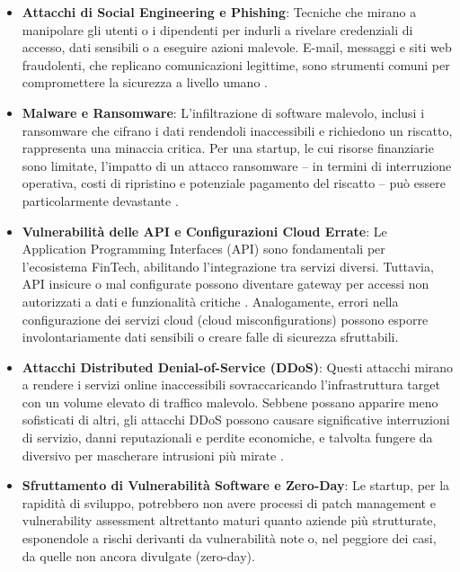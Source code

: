 \begin{itemize}
    \item \textbf{Attacchi di Social Engineering e Phishing}: Tecniche che mirano a manipolare gli utenti o i dipendenti per indurli a rivelare credenziali di accesso, dati sensibili o a eseguire azioni malevole. E-mail, messaggi e siti web fraudolenti, che replicano comunicazioni legittime, sono strumenti comuni per compromettere la sicurezza a livello umano \cite{cyberThreatsFintech}.
    
    \item \textbf{Malware e Ransomware}: L'infiltrazione di software malevolo, inclusi i ransomware che cifrano i dati rendendoli inaccessibili e richiedono un riscatto, rappresenta una minaccia critica. Per una startup, le cui risorse finanziarie sono limitate, l'impatto di un attacco ransomware – in termini di interruzione operativa, costi di ripristino e potenziale pagamento del riscatto – può essere particolarmente devastante \cite{cyberThreatsFintech}.
    
    \item \textbf{Vulnerabilità delle API e Configurazioni Cloud Errate}: Le Application Programming Interfaces (API) sono fondamentali per l'ecosistema FinTech, abilitando l'integrazione tra servizi diversi. Tuttavia, API insicure o mal configurate possono diventare gateway per accessi non autorizzati a dati e funzionalità critiche \cite{fintechChallenges}. Analogamente, errori nella configurazione dei servizi cloud (cloud misconfigurations) possono esporre involontariamente dati sensibili o creare falle di sicurezza sfruttabili.
    
    \item \textbf{Attacchi Distributed Denial-of-Service (DDoS)}: Questi attacchi mirano a rendere i servizi online inaccessibili sovraccaricando l'infrastruttura target con un volume elevato di traffico malevolo. Sebbene possano apparire meno sofisticati di altri, gli attacchi DDoS possono causare significative interruzioni di servizio, danni reputazionali e perdite economiche, e talvolta fungere da diversivo per mascherare intrusioni più mirate \cite{fintechChallenges}.
    
    \item \textbf{Sfruttamento di Vulnerabilità Software e Zero-Day}: Le startup, per la rapidità di sviluppo, potrebbero non avere processi di patch management e vulnerability assessment altrettanto maturi quanto aziende più strutturate, esponendole a rischi derivanti da vulnerabilità note o, nel peggiore dei casi, da quelle non ancora divulgate (zero-day).
\end{itemize}


